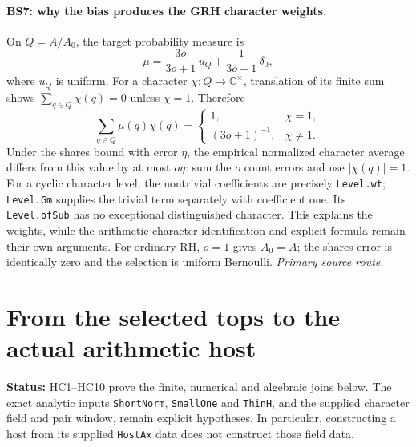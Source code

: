 \documentclass[11pt,a4paper]{article}
\numberwithin{equation}{section}
\theoremstyle{remark}\newtheorem{remark}[theorem]{Remark}
\newcommand{\status}[1]{\textbf{Status:} #1}
\begin{document}
\paragraph{BS7: why the bias produces the GRH character weights.}
On $Q=A/A_0$, the target probability measure is
\[
 \mu=\frac{3o}{3o+1}\,u_Q+\frac1{3o+1}\,\delta_0,
                                                        \tag{BS.9}
\]
where $u_Q$ is uniform. For a character $\chi:Q\to\mathbb C^\times$,
translation of its finite sum shows $\sum_{q\in Q}\chi(q)=0$
unless $\chi=1$. Therefore
\[
 \sum_{q\in Q}\mu(q)\chi(q)=
 \begin{cases}1,&\chi=1,\\(3o+1)^{-1},&\chi\ne1.\end{cases}
                                                        \tag{BS.10}
\]
Under the shares bound with error $\eta$, the empirical normalized
character average differs from this value by at most $o\eta$:
sum the $o$ count errors and use $|\chi(q)|=1$.
For a cyclic character level, the nontrivial coefficients are precisely
\texttt{Level.wt}; \texttt{Level.Gm} supplies the trivial term separately
with coefficient one. Its \texttt{Level.ofSub} has no exceptional
distinguished character.
This explains the weights, while the arithmetic character
identification and explicit formula remain their own arguments.
For ordinary RH, $o=1$ gives $A_0=A$; the shares error is identically
zero and the selection is uniform Bernoulli.
\noindent\textit{Primary source route.}\cite{balanced-tops}


\section{From the selected tops to the actual arithmetic host}
\label{sec:host-tops}

\status{HC1--HC10 prove the finite, numerical and algebraic joins below.
The exact analytic inputs \texttt{ShortNorm}, \texttt{SmallOne} and
\texttt{ThinH}, and the supplied character field and pair window, remain
explicit hypotheses. In particular, constructing a host from its supplied
\texttt{HostAx} data does not construct those field data.}
\end{document}
